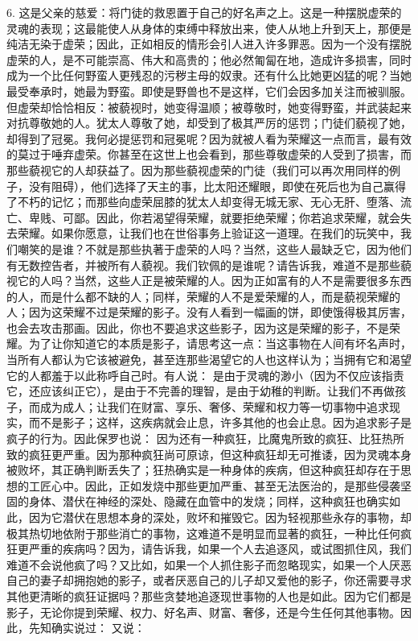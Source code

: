 6. 这是父亲的慈爱：将门徒的救恩置于自己的好名声之上。这是一种摆脱虚荣的灵魂的表现；这最能使人从身体的束缚中释放出来，使人从地上升到天上，那便是纯洁无染于虚荣；因此，正如相反的情形会引人进入许多罪恶。因为一个没有摆脱虚荣的人，是不可能崇高、伟大和高贵的；他必然匍匐在地，造成许多损害，同时成为一个比任何野蛮人更残忍的污秽主母的奴隶。还有什么比她更凶猛的呢？当她最受奉承时，她最为野蛮。即使是野兽也不是这样，它们会因多加关注而被驯服。但虚荣却恰恰相反：被藐视时，她变得温顺；被尊敬时，她变得野蛮，并武装起来对抗尊敬她的人。犹太人尊敬了她，却受到了极其严厉的惩罚；门徒们藐视了她，却得到了冠冕。我何必提惩罚和冠冕呢？因为就被人看为荣耀这一点而言，最有效的莫过于唾弃虚荣。你甚至在这世上也会看到，那些尊敬虚荣的人受到了损害，而那些藐视它的人却获益了。因为那些藐视虚荣的门徒（我们可以再次用同样的例子，没有阻碍），他们选择了天主的事，比太阳还耀眼，即使在死后也为自己赢得了不朽的记忆；而那些向虚荣屈膝的犹太人却变得无城无家、无心无肝、堕落、流亡、卑贱、可鄙。因此，你若渴望得荣耀，就要拒绝荣耀；你若追求荣耀，就会失去荣耀。如果你愿意，让我们也在世俗事务上验证这一道理。在我们的玩笑中，我们嘲笑的是谁？不就是那些执著于虚荣的人吗？当然，这些人最缺乏它，因为他们有无数控告者，并被所有人藐视。我们钦佩的是谁呢？请告诉我，难道不是那些藐视它的人吗？当然，这些人正是被荣耀的人。因为正如富有的人不是需要很多东西的人，而是什么都不缺的人；同样，荣耀的人不是爱荣耀的人，而是藐视荣耀的人；因为这荣耀不过是荣耀的影子。没有人看到一幅画的饼，即使饿得极其厉害，也会去攻击那画。因此，你也不要追求这些影子，因为这是荣耀的影子，不是荣耀。为了让你知道它的本质是影子，请思考这一点：当这事物在人间有坏名声时，当所有人都认为它该被避免，甚至连那些渴望它的人也这样认为；当拥有它和渴望它的人都羞于以此称呼自己时。有人说： 是由于灵魂的渺小（因为不仅应该指责它，还应该纠正它），是由于不完善的理智，是由于幼稚的判断。让我们不再做孩子，而成为成人；让我们在财富、享乐、奢侈、荣耀和权力等一切事物中追求现实，而不是影子；这样，这疾病就会止息，许多其他的也会止息。因为追求影子是疯子的行为。因此保罗也说：  因为还有一种疯狂，比魔鬼所致的疯狂、比狂热所致的疯狂更严重。因为那种疯狂尚可原谅，但这种疯狂却无可推诿，因为灵魂本身被败坏，其正确判断丢失了；狂热确实是一种身体的疾病，但这种疯狂却存在于思想的工匠心中。因此，正如发烧中那些更加严重、甚至无法医治的，是那些侵袭坚固的身体、潜伏在神经的深处、隐藏在血管中的发烧；同样，这种疯狂也确实如此，因为它潜伏在思想本身的深处，败坏和摧毁它。因为轻视那些永存的事物，却极其热切地依附于那些消亡的事物，这难道不是明显而显著的疯狂，一种比任何疯狂更严重的疾病吗？因为，请告诉我，如果一个人去追逐风，或试图抓住风，我们难道不会说他疯了吗？又比如，如果一个人抓住影子而忽略现实，如果一个人厌恶自己的妻子却拥抱她的影子，或者厌恶自己的儿子却又爱他的影子，你还需要寻求其他更清晰的疯狂证据吗？那些贪婪地追逐现世事物的人也是如此。因为它们都是影子，无论你提到荣耀、权力、好名声、财富、奢侈，还是今生任何其他事物。因此，先知确实说过：  又说：  